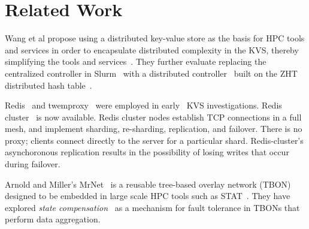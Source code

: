 \section{Related Work}

Wang et al propose using a distributed key-value store
as the basis for HPC tools and services in order to encapsulate
distributed complexity in the KVS, thereby simplifying the
tools and services~\cite{Wang:2013:USE:2503210.2503239}.
They further evaluate replacing the centralized controller in
Slurm~\cite{Jette02slurm} with a distributed controller~\cite{Slurmpp}
built on the ZHT distributed hash table~\cite{Li:2013:ZLR:2510661.2511401}.

Redis~\cite{Redis} and twemproxy~\cite{Twemproxy}
were employed in early \flux\ KVS investigations.
Redis cluster~\cite{RedisClusterTut,RedisClusterSpec} is now available.
Redis cluster nodes establish TCP connections in a full mesh, and implement
sharding, re-sharding, replication, and failover.
There is no proxy; clients connect directly to the server
for a particular shard.  Redis-cluster's asynchoronous replication
results in the possibility of losing writes that occur during failover.

Arnold and Miller's MrNet~\cite{mrnet} is a reusable tree-based overlay
network (TBON) designed to be embedded in large scale HPC tools such as
STAT~\cite{STAT}.  They have explored
{\em state compensation}~\cite{conf/ipps/ArnoldM10}
as a mechanism for fault tolerance in TBONs that perform data aggregation.

